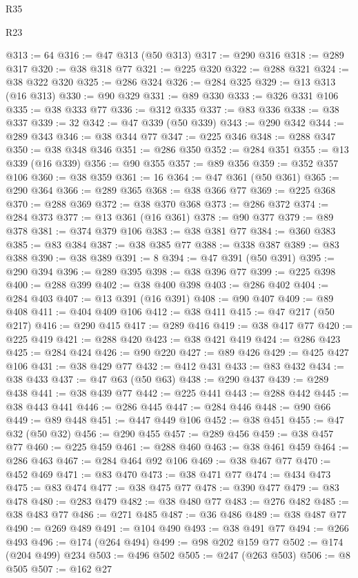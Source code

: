 \begin{lexlean}{R35}
\begin{lexlean}{R23}
\begin{coremodule}
{{{{{{{{{{{{{{{{{{{{{@313 := 64
@316 := @47 @313 (@50 @313)
@317 := @290 @316
@318 := @289 @317
@320 := @38 @318 @77
@321 := @225 @320
@322 := @288 @321
@324 := @38 @322 @320
@325 := @286 @324
@326 := @284 @325
@329 := @13 @313 (@16 @313)
@330 := @90 @329
@331 := @89 @330
@333 := @326 @331 @106
@335 := @38 @333 @77
@336 := @312 @335
@337 := @83 @336
@338 := @38 @337
@339 := 32
@342 := @47 @339 (@50 @339)
@343 := @290 @342
@344 := @289 @343
@346 := @38 @344 @77
@347 := @225 @346
@348 := @288 @347
@350 := @38 @348 @346
@351 := @286 @350
@352 := @284 @351
@355 := @13 @339 (@16 @339)
@356 := @90 @355
@357 := @89 @356
@359 := @352 @357 @106
@360 := @38 @359
@361 := 16
@364 := @47 @361 (@50 @361)
@365 := @290 @364
@366 := @289 @365
@368 := @38 @366 @77
@369 := @225 @368
@370 := @288 @369
@372 := @38 @370 @368
@373 := @286 @372
@374 := @284 @373
@377 := @13 @361 (@16 @361)
@378 := @90 @377
@379 := @89 @378
@381 := @374 @379 @106
@383 := @38 @381 @77
@384 := @360 @383
@385 := @83 @384
@387 := @38 @385 @77
@388 := @338 @387
@389 := @83 @388
@390 := @38 @389
@391 := 8
@394 := @47 @391 (@50 @391)
@395 := @290 @394
@396 := @289 @395
@398 := @38 @396 @77
@399 := @225 @398
@400 := @288 @399
@402 := @38 @400 @398
@403 := @286 @402
@404 := @284 @403
@407 := @13 @391 (@16 @391)
@408 := @90 @407
@409 := @89 @408
@411 := @404 @409 @106
@412 := @38 @411
@415 := @47 @217 (@50 @217)
@416 := @290 @415
@417 := @289 @416
@419 := @38 @417 @77
@420 := @225 @419
@421 := @288 @420
@423 := @38 @421 @419
@424 := @286 @423
@425 := @284 @424
@426 := @90 @220
@427 := @89 @426
@429 := @425 @427 @106
@431 := @38 @429 @77
@432 := @412 @431
@433 := @83 @432
@434 := @38 @433
@437 := @47 @63 (@50 @63)
@438 := @290 @437
@439 := @289 @438
@441 := @38 @439 @77
@442 := @225 @441
@443 := @288 @442
@445 := @38 @443 @441
@446 := @286 @445
@447 := @284 @446
@448 := @90 @66
@449 := @89 @448
@451 := @447 @449 @106
@452 := @38 @451
@455 := @47 @32 (@50 @32)
@456 := @290 @455
@457 := @289 @456
@459 := @38 @457 @77
@460 := @225 @459
@461 := @288 @460
@463 := @38 @461 @459
@464 := @286 @463
@467 := @284 @464 @92 @106
@469 := @38 @467 @77
@470 := @452 @469
@471 := @83 @470
@473 := @38 @471 @77
@474 := @434 @473
@475 := @83 @474
@477 := @38 @475 @77
@478 := @390 @477
@479 := @83 @478
@480 := @283 @479
@482 := @38 @480 @77
@483 := @276 @482
@485 := @38 @483 @77
@486 := @271 @485
@487 := @36 @486
@489 := @38 @487 @77
@490 := @269 @489
@491 := @104 @490
@493 := @38 @491 @77
@494 := @266 @493
@496 := @174 (@264 @494)
@499 := @98 @202 @159 @77
@502 := @174 (@204 @499) @234
@503 := @496 @502
@505 := @247 (@263 @503)
@506 := @8 @505
@507 := @162 @27
}}}}}}}}}}}}}}}}}}}}}
\end{coremodule}
\end{lexlean}
\end{lexlean}
